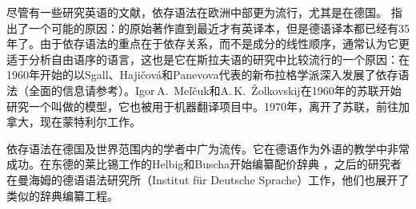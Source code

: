 尽管有一些研究英语的文献\citep{Anderson71a-u,Hudson84a-u}，依存语法在欧洲中部更为流行，尤其是在德国\citep[--57]{Engel96a}。 \citet[]{AF2010a}指出了一个可能的原因：\tes 的原始著作直到最近才有英译本\citep{Tesniere2015a-not-crossreferenced}，但是德语译本都已经有35年了\citep{Tesniere80a-u}。由于依存语法的重点在于依存关系，而不是成分的线性顺序，通常认为它更适于分析自由语序的语言，这也是它在斯拉夫语的研究中比较流行的一个原因：在1960年开始的以Sgall、Hajičová和Panevova代表的新布拉格学派深入发展了依存语法（全面的信息请参考\citealp{HS2003a-u}）。Igor\,A.\ Meľčuk和A.\,K.\ Žolkovskij在1960年的苏联开始研究一个叫做\mttc 的模型，它也被用于机器翻译项目中\citep{Melcuk64a-u,Melcuk81a,Melcuk88a-u,Kahane2003a-u}。1970年，\mel 离开了苏联，前往加拿大，现在蒙特利尔工作。

依存语法在德国及世界范围内的学者中广为流传。它在德语作为外语的教学中非常成功\citep{HB69a-u,HB98a}。在东德的莱比锡工作的Helbig和Buscha开始编纂配价辞典\citep{HS69a-u} ，之后的研究者在曼海姆的德语语法研究所（Institut für Deutsche Sprache）工作，他们也展开了类似的辞典编纂工程\citep{SKSR2004a-u}。

